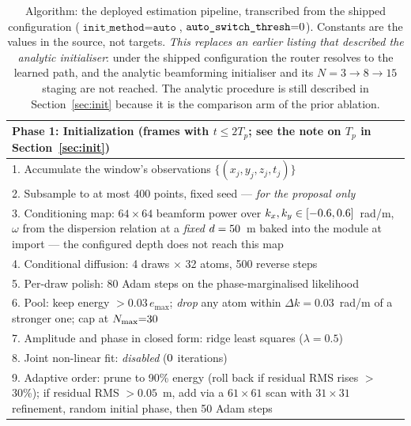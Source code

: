 \documentclass[review]{elsarticle}
\begin{document}
\begin{table}[!htbp]
\small
\centering
\caption{Algorithm: the deployed estimation pipeline, transcribed from the
shipped configuration ($\texttt{init\_method}{=}\texttt{auto}$,
$\texttt{auto\_switch\_thresh}{=}0{}$). Constants are the
values in the source, not targets. \emph{This replaces an earlier listing that
described the analytic initialiser}: under the shipped configuration the router
resolves to the learned path, and the analytic beamforming initialiser and its
$N{=}3\to8\to15$ staging are not reached. The analytic procedure is still
described in Section~\ref{sec:init} because it is the comparison arm of the prior
ablation.}
\label{alg:wavesplat}
\begin{tabular}{p{}}
\toprule
\textbf{Phase 1: Initialization} (frames with $t \le 2T_p$; see the note on $T_p$
in Section~\ref{sec:init}) \\
\midrule
1. Accumulate the window's observations $\{(x_j, y_j, z_j, t_j)\}$ \\
2. Subsample to at most 400 points, fixed seed --- \emph{for the proposal only} \\
3. Conditioning map: $64\!\times\!64$ beamform power over $k_x, k_y \in [-0.6{}, 0.6{}]$~rad/m, $\omega$ from the dispersion relation at a \emph{fixed} $d = 50{}$~m baked into the module at import --- the configured depth does not reach this map \\
4. Conditional diffusion: 4 draws $\times$ 32 atoms, 500 reverse steps \\
5. Per-draw polish: 80 Adam steps on the phase-marginalised likelihood \\
6. Pool: keep energy $> 0.03\,e_{\max}$; \emph{drop} any atom within $\Delta k{=}0.03$~rad/m of a stronger one; cap at $N_{\max}{=}30{}$ \\
7. Amplitude and phase in closed form: ridge least squares ($\lambda{=}0.5$) \\
8. Joint non-linear fit: \emph{disabled} ($0{}$ iterations) \\
9. Adaptive order: prune to 90\% energy (roll back if residual RMS rises $>$30\%); if residual RMS $>0.05$~m, add via a $61\!\times\!61$ scan with $31\!\times\!31$ refinement, random initial phase, then 50 Adam steps \\

\end{tabular}
\end{table}
\end{document}
